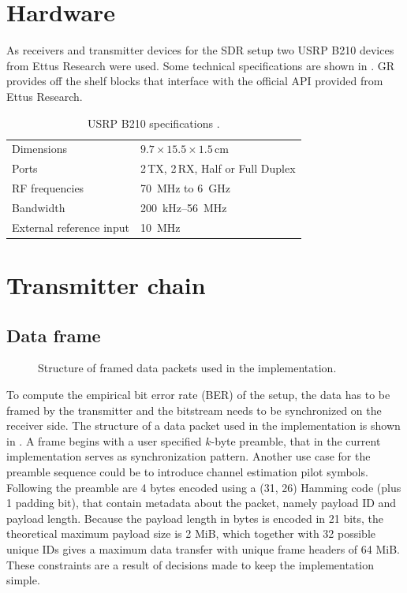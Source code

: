 \section{Hardware}

As receivers and transmitter devices for the SDR setup two USRP B210 devices from Ettus Research were used. Some technical specifications are shown in . GR provides off the shelf blocks that interface with the official API provided from Ettus Research.

\begin{table}[h]
	\centering
	\begin{tabular}{ll}
		\toprule
		Dimensions               & \(9.7 \times 15.5 \times 1.5\)\,cm \\
		Ports                    & 2\,TX, 2\,RX, Half or Full Duplex   \\
		RF frequencies           & \SI{70}{\mega\hertz} to \SI{6}{\giga\hertz} \\
		Bandwidth                & \SI{200}{\kilo\hertz}--\SI{56}{\mega\hertz} \\
		External reference input & \SI{10}{\mega\hertz}                         \\
		\bottomrule
	\end{tabular}
	\caption{USRP B210 specifications \cite{EttusUSRPB210}. \label{tab:usrp-specs}}
\end{table}

\section{Transmitter chain}

\subsection{Data frame} \label{sec:data-frame}

\begin{figure}
\centering

	\caption{
		Structure of framed data packets used in the implementation.
		\label{fig:dataframe}
	}
\end{figure}

To compute the empirical bit error rate (BER) of the setup, the data has to be framed by the transmitter and the bitstream needs to be synchronized on the receiver side. The structure of a data packet used in the implementation is shown in . A frame begins with a user specified \(k\)-byte preamble, that in the current implementation serves as synchronization pattern. Another use case for the preamble sequence could be to introduce channel estimation pilot symbols. Following the preamble are 4 bytes encoded using a (31, 26) Hamming code (plus 1 padding bit), that contain metadata about the packet, namely payload ID and payload length. Because the payload length in bytes is encoded in 21 bits, the theoretical maximum payload size is 2 MiB, which together with 32 possible unique IDs gives a maximum data transfer with unique frame headers of 64 MiB. These constraints are a result of decisions made to keep the implementation simple. %


